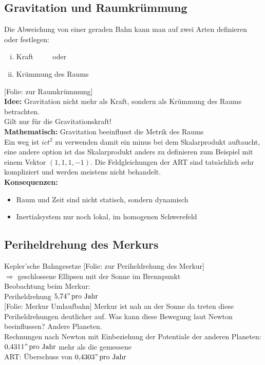 \documentclass[titlepage,11pt,a4paper,ngerman]{report}
\newcommand{\tx}[1]{\textrm{#1}}
\newcommand{\folie}[1]{\color{gray}[Folie: #1]\color{black}}
\newcommand{\lcom}[1]{\color{MidnightBlue}#1\color{black}}
\begin{document}
\subsection{Gravitation und Raumkrümmung}
Die Abweichung von einer geraden Bahn kann man auf zwei Arten definieren oder festlegen:
\begin{enumerate}[(i)]
	\item Kraft $ \qquad $ oder
	\item Krümmung des Raums
\end{enumerate}
\folie{zur Raumkrümmung}\\
\textbf{Idee:} Gravitation nicht mehr als Kraft, sondern als Krümmung des Raums betrachten.\\
\lcom{Gilt nur für die Gravitationskraft!}\\
\textbf{Mathematisch:} Gravitation beeinflusst die Metrik des Raums\\[5pt]
\lcom{Ein weg ist $ict^2$ zu verwenden damit ein minus bei dem Skalarprodukt auftaucht, eine andere option ist das Skalarprodukt anders zu definieren zum Beispiel mit einem Vektor $(1,1,1,-1)$. Die Feldgleichungen der ART sind tatsächlich sehr kompliziert und werden meistens nicht behandelt.}\\
\textbf{Konsequenzen:}
\begin{itemize}
	\item Raum und Zeit sind nicht statisch, sondern dynamisch
	\item Inertialsystem nur noch lokal, im homogenen Schwerefeld
\end{itemize}

\subsection{Periheldrehung des Merkurs}
Kepler'sche Bahngesetze \folie{zur Periheldrehung des Merkur}\\
$ \Rightarrow $ geschlossene Ellipsen mit der Sonne im Brennpunkt\\[5pt]
Beobachtung beim Merkur:\\
Periheldrehung $ 5{,}74" \, \tx{pro Jahr} $\\[5pt]
\folie{Merkur Umlaufbahn}
\lcom{Merkur ist nah an der Sonne da treten diese Periheldrehungen deutlicher auf. Was kann diese Bewegung laut Newton beeinflussen? Andere Planeten.}\\
Rechnungen nach Newton mit Einbeziehung der Potentiale der anderen Planeten: $ 0{,}4311" \, \tx{pro Jahr} $ mehr als die gemessene\\[5pt]
ART: Überschuss von $ 0{,}4303" \, \tx{pro Jahr} $
\end{document}
